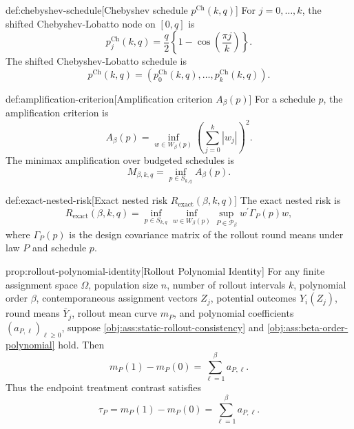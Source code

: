 \begin{definitionv}{def:chebyshev-schedule}[Chebyshev schedule \(p^{\mathrm{Ch}}(k,q)\)]
For \(j=0,\ldots,k\), the shifted Chebyshev-Lobatto node on \([0,q]\) is
\[
p^{\mathrm{Ch}}_j(k,q)
=
\frac{q}{2}\left\{1-\cos\left(\frac{\pi j}{k}\right)\right\}.
\]
The shifted Chebyshev-Lobatto schedule is
\[
p^{\mathrm{Ch}}(k,q)
=
\left(p^{\mathrm{Ch}}_0(k,q),\ldots,p^{\mathrm{Ch}}_k(k,q)\right).
\]
\end{definitionv}

\begin{definitionv}{def:amplification-criterion}[Amplification criterion \(A_\beta(p)\)]
For a schedule \(p\), the amplification criterion is
\[
A_\beta(p)
=
\inf_{w\in W_\beta(p)}
\left(\sum_{j=0}^k |w_j|\right)^2.
\]
The minimax amplification over budgeted schedules is
\[
M_{\beta,k,q}
=
\inf_{p\in S_{k,q}} A_\beta(p).
\]
\end{definitionv}

\begin{definitionv}{def:exact-nested-risk}[Exact nested risk \(R_{\mathrm{exact}}(\beta,k,q)\)]
The exact nested risk is
\[
R_{\mathrm{exact}}(\beta,k,q)
=
\inf_{p\in S_{k,q}}
\inf_{w\in W_\beta(p)}
\sup_{P\in\mathcal P_\beta}
w^\prime \Gamma_P(p) w,
\]
where \(\Gamma_P(p)\) is the design covariance matrix of the rollout round means under law \(P\) and schedule \(p\).
\end{definitionv}

\begin{lemmav}{prop:rollout-polynomial-identity}[Rollout Polynomial Identity]
For any finite assignment space $\Omega$, population size $n$, number of rollout intervals $k$, polynomial order $\beta$, contemporaneous assignment vectors $Z_j$, potential outcomes $Y_i(Z_j)$, round means $\bar Y_j$, rollout mean curve $m_P$, and polynomial coefficients $(a_{P,\ell})_{\ell\ge 0}$, suppose \cref{obj:ass:static-rollout-consistency} and \cref{obj:ass:beta-order-polynomial} hold. Then
\[
m_P(1)-m_P(0)=\sum_{\ell=1}^{\beta} a_{P,\ell}.
\]
Thus the endpoint treatment contrast satisfies
\[
\tau_P=m_P(1)-m_P(0)=\sum_{\ell=1}^{\beta} a_{P,\ell}.
\]
\end{lemmav}

